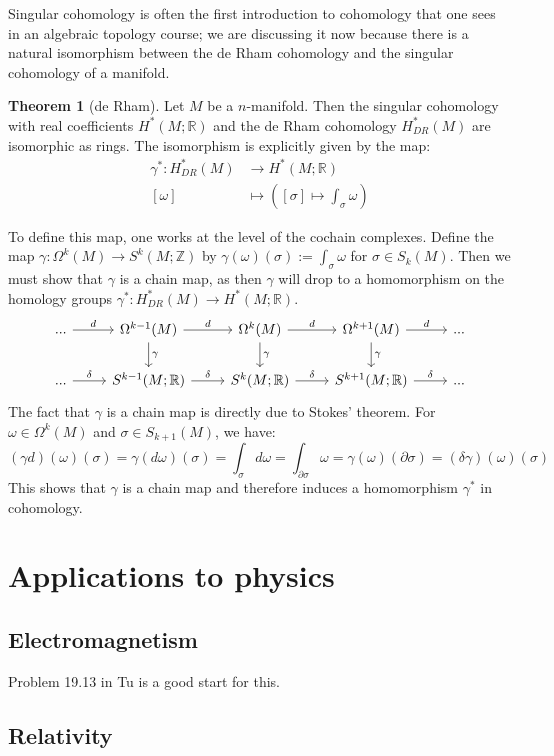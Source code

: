 \documentclass[11pt, oneside]{article}   	%
\theoremstyle{definition}
\newtheorem{theorem}{Theorem}[section]
\begin{document}
Singular cohomology is often the first introduction to cohomology that one sees in an algebraic topology course; we are 
discussing it now because there is a natural isomorphism between the de Rham cohomology and the singular cohomology 
of a manifold. 
\begin{theorem}[de Rham]
	Let $M$ be a $n$-manifold. Then the singular cohomology with real coefficients $H^*(M; \mathbb R)$ and the 
	de Rham cohomology $H_{DR}^*(M)$ are isomorphic as rings. The isomorphism is explicitly given by the map:
	\begin{align}
		\gamma^* : H_{DR}^*(M)&\rightarrow H^*(M; \mathbb R) \\
		[\omega] &\mapsto \left([\sigma]\mapsto \int_\sigma\omega\right)
	\end{align}
\end{theorem}
To define this map, one works at the level of the cochain complexes. Define the map $\gamma : \Omega^k(M)\rightarrow 
S^k(M; \mathbb Z)$ by $\gamma(\omega)(\sigma) := \int_\sigma\omega$ for $\sigma\in S_k(M)$. Then we must show 
that $\gamma$ is a chain map, as then $\gamma$ will drop to a homomorphism on the homology groups $\gamma^* : 
H_{DR}^*(M)\rightarrow H^*(M; \mathbb R)$. 
\begin{equation}\begin{tikzcd}
	...\arrow[r, "d"] & \Omega^{k - 1}(M)\arrow[d, "\gamma"]\arrow[r, "d"] & \Omega^{k}(M)\arrow[d, "\gamma"]\arrow[r, "d"] 
	& \Omega^{k + 1}(M)\arrow[d, "\gamma"]\arrow[r, "d"] & ... \\
	... \arrow[r, "\delta"] & S^{k - 1}(M; \mathbb R) \arrow[r, "\delta"] & S^{k}(M; \mathbb R) \arrow[r, "\delta"] & 
	S^{k + 1}(M; \mathbb R) \arrow[r, "\delta"] & ...
\end{tikzcd}\end{equation}
The fact that $\gamma$ is a chain map is directly due to Stokes' theorem. For $\omega\in\Omega^k(M)$ and 
$\sigma\in S_{k + 1}(M)$, we have:
\begin{equation}
	(\gamma d)(\omega)(\sigma) = \gamma(d\omega)(\sigma) = \int_\sigma d\omega = \int_{\partial\sigma}\omega = 
	\gamma(\omega)(\partial\sigma) = (\delta\gamma)(\omega)(\sigma)
\end{equation}
This shows that $\gamma$ is a chain map and therefore induces a homomorphism $\gamma^*$ in cohomology. 

\section{Applications to physics}

\subsection{Electromagnetism}

Problem 19.13 in Tu is a good start for this. 

\subsection{Relativity}
\end{document}
